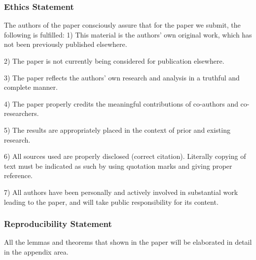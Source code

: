 \subsubsection*{Ethics Statement}
The authors of the paper consciously assure that for the paper we submit, the following is fulfilled:
1) This material is the authors' own original work, which has not been previously published elsewhere.

2) The paper is not currently being considered for publication elsewhere.

3) The paper reflects the authors' own research and analysis in a truthful and complete manner.

4) The paper properly credits the meaningful contributions of co-authors and co-researchers.

5) The results are appropriately placed in the context of prior and existing research.

6) All sources used are properly disclosed (correct citation). Literally copying of text must be indicated as such by using quotation marks and giving proper reference.

7) All authors have been personally and actively involved in substantial work leading to the paper, and will take public responsibility for its content.

\subsubsection*{Reproducibility Statement}
All the lemmas and theorems that shown in the paper will be elaborated in detail in the appendix area. 
